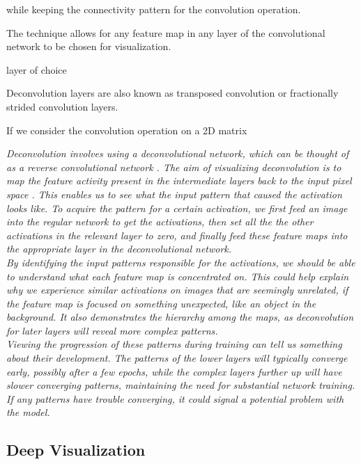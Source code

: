 while keeping the connectivity pattern for the convolution operation. 

The technique allows for any feature map in any layer of the convolutional network to be chosen for visualization.


layer of choice






Deconvolution layers are also known as transposed convolution or fractionally strided convolution layers. 

If we consider the convolution operation on a 2D matrix


\textit{Deconvolution involves using a deconvolutional network, which can be thought of as a reverse convolutional network \cite{deconv_net}. The aim of visualizing deconvolution is to map the feature activity present in the intermediate layers back to the input pixel space \cite{deconv_vis}. This enables us to see what the input pattern that caused the activation looks like. To acquire the pattern for a certain activation, we first feed an image into the regular network to get the activations, then set all the the other activations in the relevant layer to zero, and finally feed these feature maps into the appropriate layer in the deconvolutional network.} \\

\noindent \textit{By identifying the input patterns responsible for the activations, we should be able to understand what each feature map is concentrated on. This could help explain why we experience similar activations on images that are seemingly unrelated, if the feature map is focused on something unexpected, like an object in the background. It also demonstrates the hierarchy among the maps, as deconvolution for later layers will reveal more complex patterns.} \\

\noindent \textit{Viewing the progression of these patterns during training can tell us something about their development. The patterns of the lower layers will typically converge early, possibly after a few epochs, while the complex layers further up will have slower converging patterns, maintaining the need for substantial network training. If any patterns have trouble converging, it could signal a potential problem with the model.}

\subsection{Deep Visualization}

